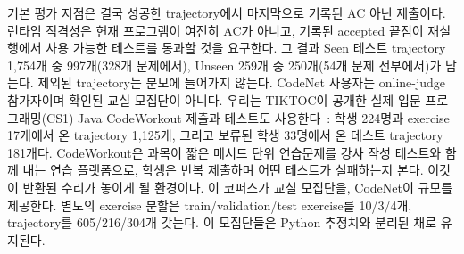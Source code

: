 \documentclass[10pt,conference]{IEEEtran}
\begin{document}
기본 평가 지점은 결국 성공한 trajectory에서 마지막으로 기록된 AC 아닌 제출이다. 런타임 적격성은 현재 프로그램이 여전히 AC가 아니고, 기록된 accepted 끝점이 재실행에서 사용 가능한 테스트를 통과할 것을 요구한다. 그 결과 Seen 테스트 trajectory 1,754개 중 997개(328개 문제에서), Unseen 259개 중 250개(54개 문제 전부에서)가 남는다. 제외된 trajectory는 분모에 들어가지 않는다. CodeNet 사용자는 online-judge 참가자이며 확인된 교실 모집단이 아니다. 우리는 TIKTOC이 공개한 실제 입문 프로그래밍(CS1) Java CodeWorkout 제출과 테스트도 사용한다~\cite{duan2024tiktoc}: 학생 224명과 exercise 17개에서 온 trajectory 1,125개, 그리고 보류된 학생 33명에서 온 테스트 trajectory 181개다. CodeWorkout은 과목이 짧은 메서드 단위 연습문제를 강사 작성 테스트와 함께 내는 연습 플랫폼으로, 학생은 반복 제출하며 어떤 테스트가 실패하는지 본다. 이것이 반환된 수리가 놓이게 될 환경이다. 이 코퍼스가 교실 모집단을, CodeNet이 규모를 제공한다. 별도의 exercise 분할은 train/validation/test exercise를 10/3/4개, trajectory를 605/216/304개 갖는다. 이 모집단들은 Python 추정치와 분리된 채로 유지된다.
\end{document}
